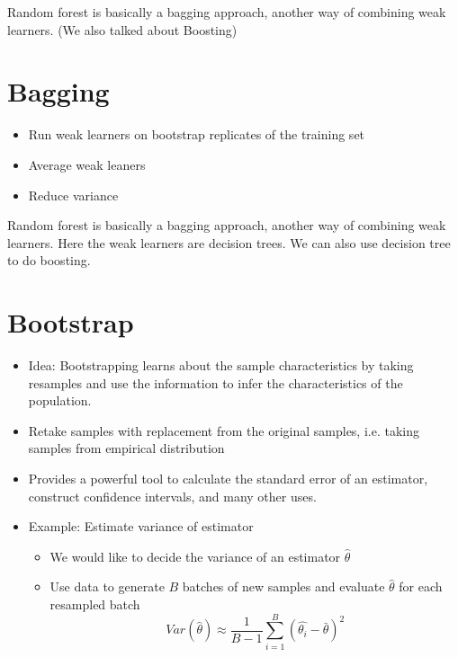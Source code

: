 \documentclass[twoside,12pt]{article}
\begin{document}
Random forest is basically a bagging approach, another way of combining weak learners. (We also talked about Boosting)
\section{Bagging}
\begin{itemize}
\item Run weak learners on bootstrap replicates of the training set
\item Average weak leaners 
\item Reduce variance
\end{itemize}

Random forest is basically a bagging approach, another way of combining weak learners. Here the weak learners are decision trees. We can also use decision tree to do boosting. 

\section{Bootstrap}
\begin{itemize}
\item Idea: Bootstrapping learns about the sample characteristics by taking resamples and use the information to infer the characteristics of the population. 
\item Retake samples with replacement from the original samples, i.e. taking samples from empirical distribution 
\item Provides a powerful tool to calculate the standard error of an estimator, construct confidence intervals, and many other uses. 
\item Example: Estimate variance of estimator 
\begin{itemize}
\item We would like to decide the variance of an estimator $\hat{\theta}$
\item Use data to generate $B$ batches of new samples and evaluate $\hat{\theta}$ for each resampled batch
$$Var(\hat{\theta}) \approx \frac{1}{B-1}\sum_{i=1}^B (\hat{\theta_i} - \bar{\theta})^2$$
\end{itemize}
\end{itemize}
\end{document}
